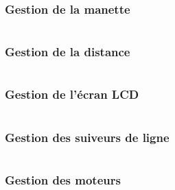     \subsubsection{Gestion de la manette}
        \inputminted[breaklines]{c}{code/src/controller.c}
    \subsubsection{Gestion de la distance}
        \inputminted[breaklines]{c}{code/src/distance.c}
    \subsubsection{Gestion de l'écran LCD}
        \inputminted[breaklines]{c}{code/src/i2cLCD.c}
    \subsubsection{Gestion des suiveurs de ligne}
        \inputminted[breaklines]{c}{code/src/lineFinder.c}
    \subsubsection{Gestion des moteurs}
        \inputminted[breaklines]{c}{code/src/motors.c}

\newpage